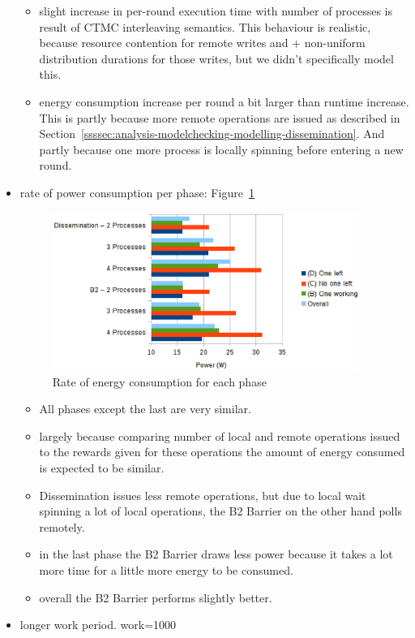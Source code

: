 \documentclass[a4paper, 10pt]{article}
\begin{document}
\begin{itemize}
\begin{itemize}
			\item slight increase in per-round execution time with number of processes is result of CTMC interleaving semantics. This behaviour is realistic, because resource contention for remote writes and + non-uniform distribution durations for those writes, but we didn't specifically model this.
			\item energy consumption increase per round a bit larger than runtime increase. This is partly because more remote operations are issued as described in Section~\ref{ssssec:analysis-modelchecking-modelling-dissemination}. And partly because one more process is locally spinning before entering a new round.
		\end{itemize}
	\item rate of power consumption per phase: Figure~\ref{fig:d2-power-work-100}
		\begin{figure}[htbp]
			\centering
			\includegraphics[width=10cm]{charts/d2-power-work-100}
			\caption{Rate of energy consumption for each phase}
			\label{fig:d2-power-work-100}
		\end{figure}
		\begin{itemize}
			\item All phases except the last are very similar.
			\item largely because comparing number of local and remote operations issued to the rewards given for these operations the amount of energy consumed is expected to be similar.
			\item Dissemination issues less remote operations, but due to local wait spinning a lot of local operations, the B2 Barrier on the other hand polls remotely.
			\item in the last phase the B2 Barrier draws less power because it takes a lot more time for a little more energy to be consumed.
			\item overall the B2 Barrier performs slightly better.
		\end{itemize}
	\item longer work period. work=1000

\end{itemize}
\end{document}
